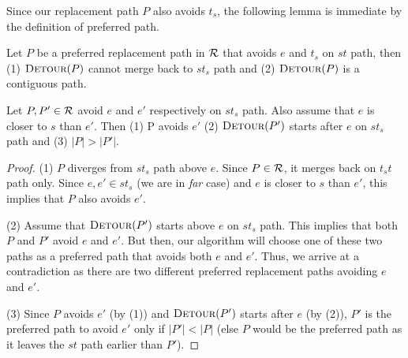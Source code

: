 \begin{comment}
\begin{lemma}
\label{lem:prop}
Let $P$ be a replacement path in $\RR$ that avoids $u$ on $st_s$ path. Then
 $P$ can merge back to $st$ path just once.
\end{lemma}
\begin{proof}
Since $P$ is a replacement path from $s$ to $t$ avoiding $u$, it necessary has to merge somewhere on path $st$. Assume that $P$ merges back at $w$ on $st$ path. Note that $w$ cannot lie before $u$ on $st$ path as the sub-path $sw$ of the $st$ path is the shortest path from $s$ to $w$. This implies that $w$ lies after $u$ on $st$ path. After merging at $w$, $P$ can continue on the sub path $wt$ (of path $st$) to reach $t$, as this is the shortest path from $w$ to $t$.
\end{proof}
\end{comment}
\noindent Since our  replacement path $P$  also avoids $t_s$, the following lemma is immediate by the definition of preferred path.

\begin{lemma}
Let $P$ be a preferred replacement path in $\mathcal{R}$ that avoids $e$ and $t_s$ on
$st$ path, then (1) $\textsc{Detour}(P)$ cannot merge back to $st_s$ path and (2) $\textsc{Detour}(P)$ is a contiguous path.
\end{lemma}
\begin{lemma}
\label{lem:avoids}
Let $P,P' \in \mathcal{R}$ avoid $e$ and $e'$ respectively on $st_s$ path. Also assume that $e$ is closer to $s$ than $e'$. Then
(1)  P avoids $e'$  (2) $\textsc{Detour}(P')$ starts  after $e$ on $st_s$ path and (3) $|P| > |P'|$.

\end{lemma}

\iflong
  \begin{proof}

  \noindent (1) $P$ diverges from $st_s$ path above $e$. Since $P
  \in \mathcal{R}$, it   merges back on $t_st$ path only. Since $e,e'
  \in st_s$ (we are in {\em far} case) and $e$ is closer to $s$ than $e'$, this implies
  that $P$ also avoids $e'$.

  \noindent (2) Assume that  $\textsc{Detour}(P')$ starts above $e$ on
  $st_s$ path. This implies that both $P$ and $P'$ avoid $e$
  and $e'$. But then, our algorithm will choose one of these two paths as a preferred path that avoids both $e$ and $e'$.  Thus,
  we arrive at a contradiction as there are two different preferred replacement paths avoiding $e$ and $e'$.

  \noindent (3) Since $P$  avoids $e'$ (by (1)) and $\textsc{Detour}(P')$ starts after $e$ (by (2)), $P'$ is the preferred path to avoid $e'$ only if $|P'| < |P|$ (else $P$ would be the preferred path as it leaves the $st$ path earlier than $P'$).



  \end{proof}
\fi

